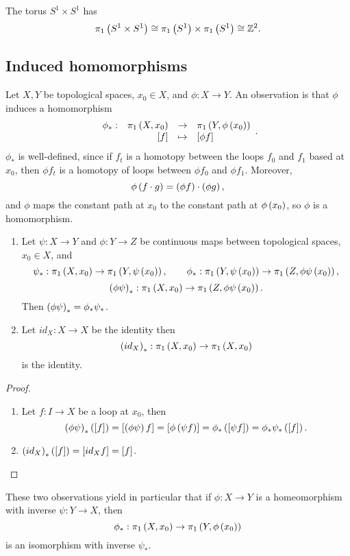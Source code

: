 \begin{example*}
The torus $ S^1 \times S^1 $ has
$$ \pi_1\left( S^1 \times S^1 \right) \cong \pi_1\left( S^1 \right) \times \pi_1\left( S^1 \right) \cong \mathbb{Z}^2. $$
\end{example*}

\subsection{Induced homomorphisms}

Let $ X, Y $ be topological spaces, $ x_0 \in X $, and $ \phi : X \to Y $. An observation is that $ \phi $ induces a homomorphism
$$ \function[\phi_*]{\pi_1\rb{X, x_0}}{\pi_1\rb{Y, \phi\rb{x_0}}}{\sb{f}}{\sb{\phi f}}. $$
$ \phi_* $ is well-defined, since if $ f_t $ is a homotopy between the loops $ f_0 $ and $ f_1 $ based at $ x_0 $, then $ \phi f_t $ is a homotopy of loops between $ \phi f_0 $ and $ \phi f_1 $. Moreover,
$$ \phi\left( f \cdot g \right) = \left( \phi f \right) \cdot \left( \phi g \right), $$
and $ \phi $ maps the constant path at $ x_0 $ to the constant path at $ \phi\left( x_0 \right) $, so $ \phi $ is a homomorphism.

\begin{proposition}
\hfill
\begin{enumerate}
\item Let $ \psi : X \to Y $ and $ \phi : Y \to Z $ be continuous maps between topological spaces, $ x_0 \in X $, and
$$ \psi_* : \pi_1\left( X, x_0 \right) \to \pi_1\left( Y, \psi\left( x_0 \right) \right), \qquad \phi_* : \pi_1\left( Y, \psi\left( x_0 \right) \right) \to \pi_1\left( Z, \phi\psi\left( x_0 \right) \right), $$
$$ \left( \phi\psi \right)_* : \pi_1\left( X, x_0 \right) \to \pi_1\left( Z, \phi\psi\left( x_0 \right) \right). $$
Then $ \left( \phi\psi \right)_* = \phi_*\psi_* $.
\item Let $ id_X : X \to X $ be the identity then
$$ \left( id_X \right)_* : \pi_1\left( X, x_0 \right) \to \pi_1\left( X, x_0 \right) $$
is the identity.
\end{enumerate}
\end{proposition}

\begin{proof}
\hfill
\begin{enumerate}
\item Let $ f : I \to X $ be a loop at $ x_0 $, then
$$ \left( \phi\psi \right)_*\left( \left[ f \right] \right) = \left[ \left( \phi\psi \right)f \right] = \left[ \phi\left( \psi f \right) \right] = \phi_*\left( \left[ \psi f \right] \right) = \phi_*\psi_*\left( \left[ f \right] \right). $$
\item $ \left( id_X \right)_*\left( \left[ f \right] \right) = \left[ id_Xf \right] = \left[ f \right] $.
\end{enumerate}
\end{proof}

These two observations yield in particular that if $ \phi : X \to Y $ is a homeomorphism with inverse $ \psi : Y \to X $, then
$$ \phi_* : \pi_1\left( X, x_0 \right) \to \pi_1\left( Y, \phi\left( x_0 \right) \right) $$
is an isomorphism with inverse $ \psi_* $.


